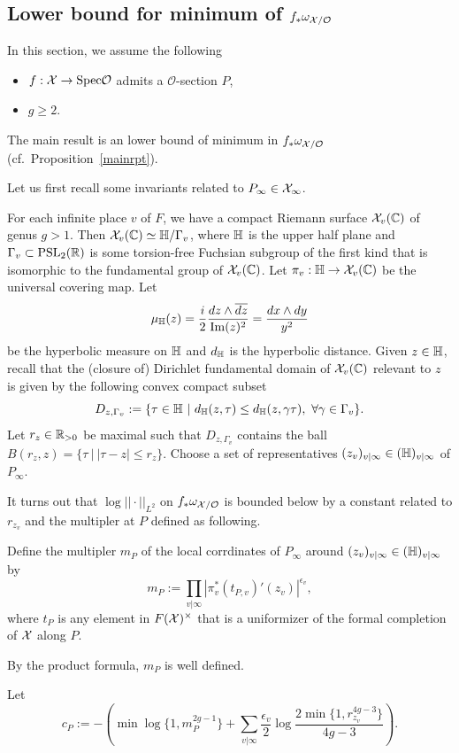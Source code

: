 \documentclass[]{amsart}
\newcommand{\BC}{{\mathbb {C}}} \newcommand{\BD}{{\mathbb {D}}}
\newcommand{\CO}{{\mathcal {O}}} \newcommand{\CP}{{\mathcal {P}}}
\newcommand{\Spec}{{\mathrm{Spec}}} \newcommand{\Spf}{{\mathrm{Spf}}}
\newcommand{\ra}{\rightarrow} \newcommand{\imp}{\Longrightarrow}
\theoremstyle{plain}
\theoremstyle{remark} \newtheorem{remark}[thm]{Remark}
\theoremstyle{remark} \newtheorem{exercise}{Exercise}
\theoremstyle{remark} \newtheorem{example}{Example}
\numberwithin{equation}{section}
\begin{document}
\subsection{Lower bound for minimum of $f_*\omega_{\CX/\CO}$}\label{Upper1}
In this section, we assume the following 
\begin{itemize}
  \item [\tiny{$\bullet$}] $f:\CX\ra \Spec\CO$ admits a $\CO$-section $P$,
  \item [\tiny{$\bullet$}] $g\geq 2$.
\end{itemize}
The main result is an lower bound of minimum in $f_*\omega_{\CX/\CO}$ (cf.~Proposition~\ref{mainrpt}).

Let us first recall some invariants related to $P_\infty\in {\mathcal {X}}_{\infty}$.


For each infinite place $v$ of $F$, we have a compact Riemann surface $\CX_v(\BC)$ of genus $g>1$. Then $\CX_v(\BC)\simeq \BH/\Gamma_v$, where ${\mathbb {H}}$ is the upper half plane and $\Gamma_v\subset {\mathrm{PSL}}_2({\mathbb {R}})$ is some torsion-free Fuchsian subgroup of the first kind that is isomorphic to the fundamental group of $\CX_v(\BC)$. 
Let $\pi_v: \BH\ra \CX_v(\BC)$ be the universal covering map.
 Let \[\mu_{{\mathbb {H}}}(z)=\frac{i}{2}\frac{dz\wedge\overline{dz}}{{\mathrm{Im}}(z)^2}=\frac{dx\wedge dy}{y^2}\] be the hyperbolic measure on ${\mathbb {H}}$ and $d_{\mathbb {H}}$ is the hyperbolic distance. Given $z\in {\mathbb {H}}$, recall that the (closure of) Dirichlet fundamental domain of $\CX_v(\BC)$ relevant to $z$ is given by the following convex compact subset
 \[D_{z,\Gamma_v}:=\{\tau\in \BH\ |\ d_{\BH}(z,\tau)\leq d_{\BH}(z,\gamma\tau),\ \forall \gamma\in \Gamma_v\}.\]  Let $r_z\in {\mathbb {R}}_{>0}$ be maximal such that ${D_{z,\Gamma_v}}$ contains the ball $B(r_z,z)=\{\tau\ |\ |\tau-z|\leq r_z\}$.
 Choose a set of representatives $(z_v)_{v|\infty}\in ({\mathbb {H}})_{v|\infty}$ of $P_\infty$. 
 
 It turns out that $\log||\cdot||_{L^2}$ on $f_*\omega_{\CX/\CO}$ is bounded below by a constant related to $r_{z_v}$ and the multipler at $P$ defined as following.
\begin{defn}\label{mul}
Define the multipler $m_P$ of the local corrdinates of $P_\infty$ around $(z_v)_{v|\infty}\in ({\mathbb {H}})_{v|\infty}$ by 
\[m_P:=\prod_{v|\infty}|\pi_v^{*}(t_{P,v})'(z_v)|^{\epsilon_v},\]where $t_P$ is any element in $F({\mathcal {X}})^\times$ that is a uniformizer of the formal completion of ${\mathcal {X}}$ along $P$.
\end{defn}
By the product formula, $m_P$ is well defined.

Let \begin{equation}\label{loccor}c_P:=-\left(\min\log\{1,m_P^{2g-1}\}+\sum_{v|\infty}\frac{\epsilon_v}{2}\log \frac{2\min\{1,r_{z_v}^{4g-3}\}}{4g-3}\right).\end{equation}
\end{document}
